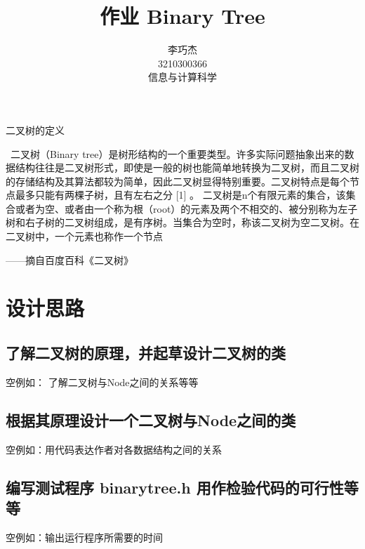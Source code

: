 \documentclass[UTF8]{ctexart}
\title{作业 Binary Tree}
\author{李巧杰 \\ 3210300366 \\ 信息与计算科学}
\begin{document}
\maketitle

\begin{center}
二叉树的定义
\end{center}

\   二叉树（Binary tree）是树形结构的一个重要类型。许多实际问题抽象出来的数据结构往往是二叉树形式，即使是一般的树也能简单地转换为二叉树，而且二叉树的存储结构及其算法都较为简单，因此二叉树显得特别重要。二叉树特点是每个节点最多只能有两棵子树，且有左右之分 [1]  。
二叉树是n个有限元素的集合，该集合或者为空、或者由一个称为根（root）的元素及两个不相交的、被分别称为左子树和右子树的二叉树组成，是有序树。当集合为空时，称该二叉树为空二叉树。在二叉树中，一个元素也称作一个节点

\begin{flushright}
——摘自百度百科《二叉树》
\end{flushright}

\section{设计思路}

\subsection{了解二叉树的原理，并起草设计二叉树的类}
\hphantom 空例如： 了解二叉树与Node之间的关系等等

\subsection{根据其原理设计一个二叉树与Node之间的类}
\hphantom 空例如：用代码表达作者对各数据结构之间的关系

\subsection{编写测试程序 binarytree.h 用作检验代码的可行性等等}
\hphantom 空例如：输出运行程序所需要的时间
\end{document}
